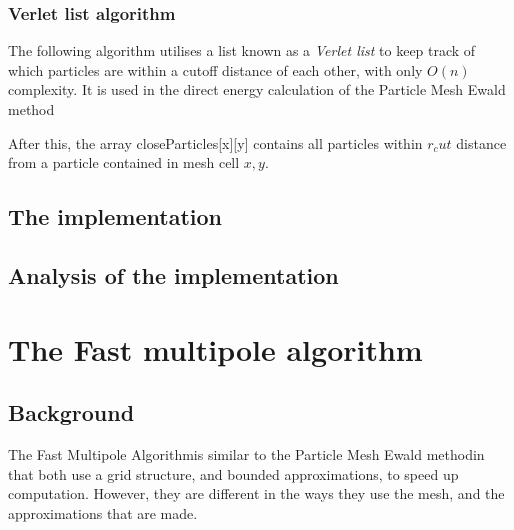 \documentclass[pdftex,twoside,a4paper]{report}
\newcommand{\pmem}{Particle Mesh Ewald method}
\newcommand{\fma}{Fast Multipole Algorithm}
\begin{document}
\subsubsection{Verlet list algorithm}
\label{sec:verlet}
The following algorithm utilises a list known as a \emph{Verlet list} to keep track of which particles are within a cutoff distance of each other, with only $O(n)$ complexity. It is used in the direct energy calculation of the \pmem\\
\begin{algorithm}[H]
\SetLine
{}
\end{algorithm}
After this, the array closeParticles[x][y] contains all particles within $r_cut$ distance from a particle contained in mesh cell $x,y$.
\subsection{The implementation}
\subsection{Analysis of the implementation}

\section{The Fast multipole algorithm}
\subsection{Background}
The \fma is similar to the \pmem in that both use a grid structure, and bounded approximations, to speed up computation. However, they are different in the ways they use the mesh, and the approximations that are made.
\end{document}
